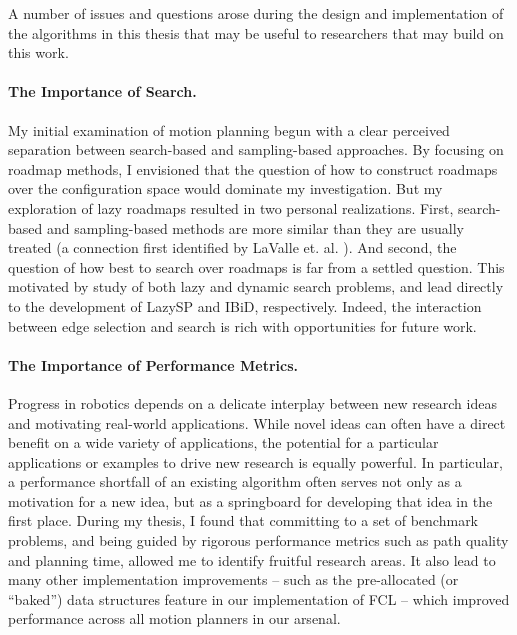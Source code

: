 
A number of issues and questions arose during the design and
implementation of the algorithms in this thesis
that may be useful to researchers that may build on this work.

\paragraph{The Importance of Search.}
My initial examination of motion planning begun with a clear
perceived separation between search-based and sampling-based
approaches.
By focusing on roadmap methods,
I envisioned that the question of how to construct roadmaps
over the configuration space would dominate my investigation.
But my exploration of lazy roadmaps resulted in two
personal realizations.
First,
search-based and sampling-based methods are more similar than they are
usually treated
(a connection first identified by LaValle et. al.
\citep{lavalle2004deterministic}).
And second,
the question of how best to search over roadmaps is far from a settled
question.
This motivated by study of both lazy and dynamic search problems,
and lead directly to the development of LazySP and IBiD,
respectively.
Indeed,
the interaction between edge selection and search is rich
with opportunities for future work.

\paragraph{The Importance of Performance Metrics.}
Progress in robotics depends on a delicate interplay between
new research ideas and motivating real-world applications.
While novel ideas can often have a direct benefit on a wide variety
of applications,
the potential for a particular applications or examples
to drive new research is equally powerful.
In particular,
a performance shortfall of an existing algorithm
often serves not only as a motivation for a new idea,
but as a springboard for developing that idea in the first place.
During my thesis,
I found that committing to a set of benchmark problems,
and being guided by rigorous performance metrics such as path
quality and planning time,
allowed me to identify fruitful research areas.
It also lead to many other implementation improvements
-- such as the pre-allocated (or ``baked'') data structures feature
in our implementation of FCL -- which improved performance
across all motion planners in our arsenal.

